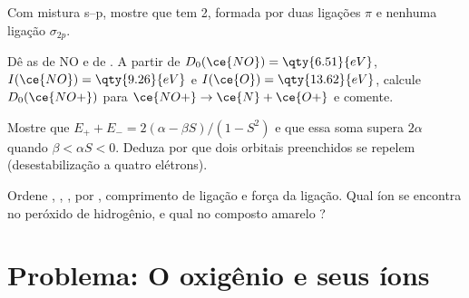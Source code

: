 \begin{exercise}[$\star\star$]\label{exo:b2:diatomic-mos:9}
Com mistura s--p, mostre que  tem  2, formada por duas
ligações $\pi$ e nenhuma ligação $\sigma_{2p}$.
\end{exercise}

\begin{exercise}[$\star\star\star$]\label{exo:b2:diatomic-mos:10}
Dê as  de NO e de . A partir de $D_0(\ce{NO}) = \qty{6.51}{eV}$, $I(\ce{NO}) =
\qty{9.26}{eV}$ e $I(\ce{O}) = \qty{13.62}{eV}$, calcule $D_0(\ce{NO+})$ para $\ce{NO+} \to
\ce{N} + \ce{O+}$ e comente.
\end{exercise}

\begin{exercise}[$\star\star\star$]\label{exo:b2:diatomic-mos:11}
Mostre que $E_+ + E_- = 2(\alpha - \beta S)/(1 - S^2)$ e que essa soma supera $2\alpha$ quando
$\beta < \alpha S < 0$. Deduza por que dois orbitais preenchidos se repelem
(desestabilização a quatro elétrons).
\end{exercise}

\begin{exercise}[$\star\star\star$]\label{exo:b2:diatomic-mos:12}
Ordene , , ,  por , comprimento
de ligação e força da ligação. Qual íon se encontra no peróxido de hidrogênio, e
qual no composto amarelo ?
\end{exercise}

\section{Problema: O oxigênio e seus íons}

